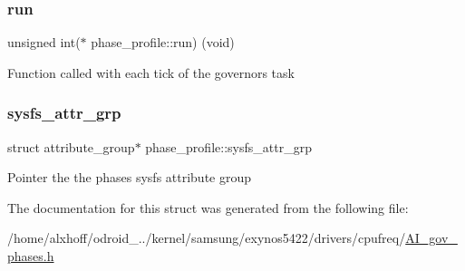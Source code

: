 \subsubsection{\texorpdfstring{run}{run}}
{\footnotesize\ttfamily unsigned int($\ast$ phase\+\_\+profile\+::run) (void)}

Function called with each tick of the governor\textquotesingle{}s task \mbox{\label{structphase__profile_a75fa703877db612110bead3a231685ee}} 
\subsubsection{\texorpdfstring{sysfs\+\_\+attr\+\_\+grp}{sysfs\_attr\_grp}}
{\footnotesize\ttfamily struct attribute\+\_\+group$\ast$ phase\+\_\+profile\+::sysfs\+\_\+attr\+\_\+grp}

Pointer the the phase\textquotesingle{}s sysfs attribute group 

The documentation for this struct was generated from the following file\+:\begin{DoxyCompactItemize}
\item 
/home/alxhoff/odroid\+\_../kernel/samsung/exynos5422/drivers/cpufreq/\hyperlink{AI__gov__phases_8h}{A\+I\+\_\+gov\+\_\+phases.\+h}\end{DoxyCompactItemize}
